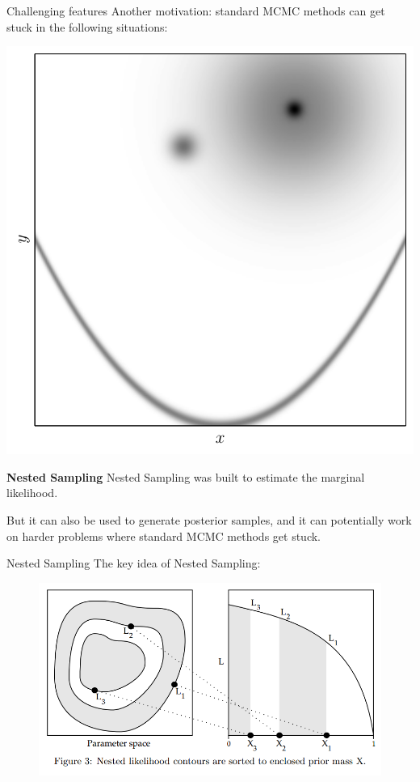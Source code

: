 \begin{frame}[t]{Challenging features}
Another motivation: standard MCMC methods can get stuck in the following
situations:
\begin{center}
\includegraphics[scale=0.4]{challenges.pdf}
\end{center}
\end{frame}

\begin{frame}{\small{\textbf{Nested Sampling}}}
Nested Sampling was built to estimate the marginal likelihood.

But it can also be used to generate posterior samples, and it can potentially
work on harder problems where standard MCMC methods get stuck.
\end{frame}

\begin{frame}[t]{Nested Sampling}
The key idea of Nested Sampling: 

\begin{figure}
\begin{center}
\includegraphics[scale=0.4]{ns.png}
\end{center}
\end{figure}


\end{frame}


